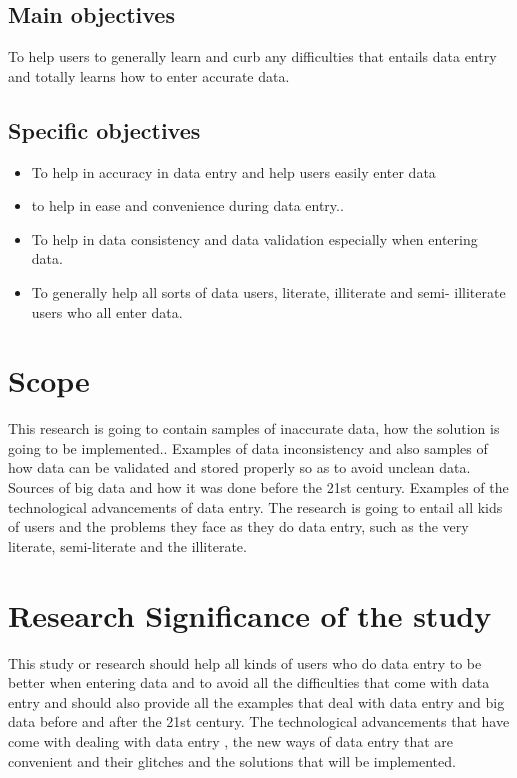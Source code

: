 \documentclass[12pt,]{article}
\begin{document}
\subsection{ Main objectives}
To help users to generally learn and curb any difficulties that entails data entry and totally learns how to enter accurate data.
\subsection{Specific objectives}
\begin{itemize}
\item To help in accuracy in data entry and help users easily enter data
\item to help in ease and convenience during data entry..
\item To help in data consistency and data validation especially when entering data.
\item To generally help all sorts of data users, literate, illiterate and semi- illiterate users who all enter data.
\end{itemize}

\section{Scope}
This research is going to contain samples of inaccurate data, how the solution is going to be implemented.. Examples of data inconsistency and also samples of how data can be validated and stored properly so as to avoid unclean data. Sources of big data and how it was done before the 21st century. Examples of the technological advancements of data entry. The research is going to entail all kids of users and the problems they face as they do data entry, such as the very literate, semi-literate and the illiterate. 
\section{Research Significance of the study}
This study or research should help all kinds of users who do data entry to be better when entering data and to avoid all the difficulties that come with data entry and should also provide all the examples that deal with data entry and big data  before and after the 21st century. The technological advancements that have come with dealing with data entry , the new ways of data entry that are convenient and their glitches and the solutions that will be implemented.
\end{document}
